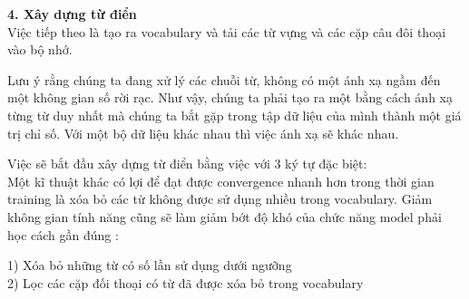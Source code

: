 \textbf{4. Xây dựng từ điển} \\
Việc tiếp theo là tạo ra vocabulary và tải các từ vựng và các cặp câu đôi thoại vào bộ nhớ.

Lưu ý rằng chúng ta đang xử lý các chuỗi từ, không có một ánh xạ ngầm đến một không gian số rời rạc. Như vậy, chúng ta
phải tạo ra một bằng cách ánh xạ từng từ duy nhất mà chúng ta bắt gặp trong tập dữ liệu của mình thành một giá trị chỉ số.
Với một bộ dữ liệu khác nhau thì việc ánh xạ sẽ khác nhau.

Việc sẽ bắt đầu xây dựng từ điển bằng việc với 3 ký tự đặc biệt: \\

Một kĩ thuật khác có lợi để đạt được convergence nhanh hơn trong thời gian training là xóa bỏ các từ không được sử dụng nhiều trong vocabulary. Giảm không gian tính năng cũng sẽ làm giảm bớt độ khó của chức năng model phải học cách gần đúng :

1) Xóa bỏ những từ có số lần sử dụng dưới ngưỡng \\
2) Lọc các cặp đối thoại có từ đã được xóa bỏ trong vocabulary \\
